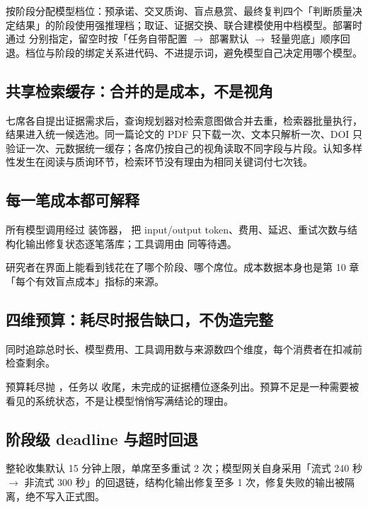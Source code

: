  按阶段分配模型档位：预承诺、交叉质询、盲点悬赏、最终复判四个「判断质量决定结果」的阶段使用强推理档；取证、证据交换、联合建模使用中档模型。部署时通过  分别指定，留空时按「任务自带配置 $\rightarrow$ 部署默认 $\rightarrow$ 轻量兜底」顺序回退。档位与阶段的绑定关系进代码、不进提示词，避免模型自己决定用哪个模型。

\subsection{共享检索缓存：合并的是成本，不是视角}

七席各自提出证据需求后，查询规划器对检索意图做合并去重，检索器批量执行，结果进入统一候选池。同一篇论文的 PDF 只下载一次、文本只解析一次、DOI 只验证一次、元数据统一缓存；各席仍按自己的视角读取不同字段与片段。认知多样性发生在阅读与质询环节，检索环节没有理由为相同关键词付七次钱。

\subsection{每一笔成本都可解释}

所有模型调用经过  装饰器， 把 input/output token、费用、延迟、重试次数与结构化输出修复状态逐笔落库；工具调用由  同等待遇。

研究者在界面上能看到钱花在了哪个阶段、哪个席位。成本数据本身也是第 10 章「每个有效盲点成本」指标的来源。

\subsection{四维预算：耗尽时报告缺口，不伪造完整}

 同时追踪总时长、模型费用、工具调用数与来源数四个维度，每个消费者在扣减前检查剩余。

预算耗尽抛 ，任务以  收尾，未完成的证据槽位逐条列出。预算不足是一种需要被看见的系统状态，不是让模型悄悄写满结论的理由。

\subsection{阶段级 deadline 与超时回退}

整轮收集默认 15 分钟上限，单席至多重试 2 次；模型网关自身采用「流式 240 秒 $\rightarrow$ 非流式 300 秒」的回退链，结构化输出修复至多 1 次，修复失败的输出被隔离，绝不写入正式图。

